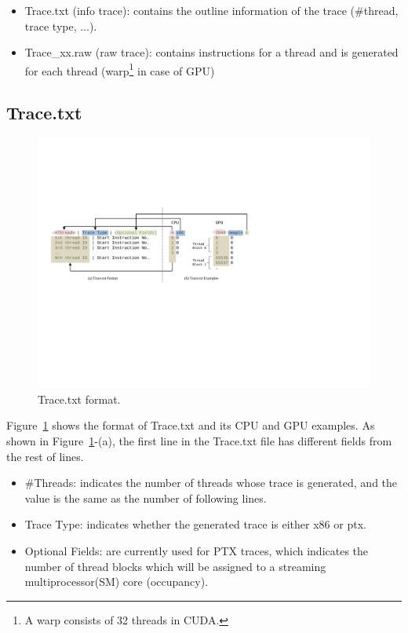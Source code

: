 \begin{itemize}\itemsep2pt
\item Trace.txt (info trace): contains the outline information of the trace (\#thread, trace type, ...).
\item Trace\_xx.raw (raw trace): contains instructions for a thread and is generated for each thread (warp\footnote{A warp consists of 32 threads in CUDA.} in case of GPU)
\end{itemize}



\subsection{Trace.txt}


\begin{figure}[htb]
\centering
\includegraphics{figs/trace_format}
\caption{Trace.txt format.}
\label{fig:trace_format}
\end{figure}

Figure~\ref{fig:trace_format} shows the format of Trace.txt and its CPU and GPU
examples.  As shown in Figure~\ref{fig:trace_format}-(a), the first line in the
Trace.txt file has different fields from the rest of lines.

\begin{itemize}\itemsep2pt
\item \#Threads: indicates the number of threads whose trace is generated, and the value 
is the same as the number of following lines. 
\item Trace Type: indicates whether the generated trace is either x86 or ptx.
\item Optional Fields: are currently used for PTX traces, which indicates the number of thread blocks
which will be assigned to a streaming multiprocessor(SM) core (occupancy).
\end{itemize}

